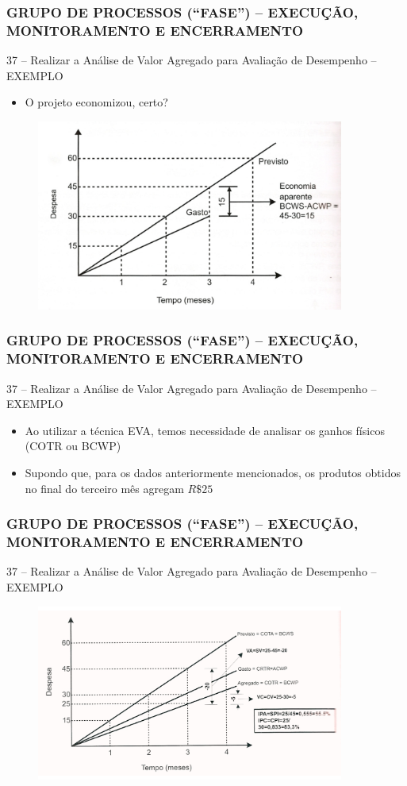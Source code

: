 \begin{frame}
 \frametitle{GRUPO DE PROCESSOS (“FASE”) – \small{EXECUÇÃO, MONITORAMENTO E ENCERRAMENTO}}
 37 – Realizar a Análise de Valor Agregado para Avaliação de Desempenho – EXEMPLO
  \begin{itemize}
   \item O projeto economizou, certo?
  \end{itemize}
  \begin{figure}
   \centering
   \includegraphics[width = 0.9\textwidth]{figs/fig9.png}
  \end{figure}
\end{frame}

\begin{frame}
 \frametitle{GRUPO DE PROCESSOS (“FASE”) – \small{EXECUÇÃO, MONITORAMENTO E ENCERRAMENTO}}
 37 – Realizar a Análise de Valor Agregado para Avaliação de Desempenho – EXEMPLO
  \begin{itemize}
   \item Ao utilizar a técnica EVA, temos necessidade de analisar os ganhos físicos (COTR ou BCWP)
  \item Supondo que, para os dados anteriormente mencionados, os produtos obtidos no final do terceiro mês agregam $R\$25$
  \end{itemize}
\end{frame}

\begin{frame}
 \frametitle{GRUPO DE PROCESSOS (“FASE”) – \small{EXECUÇÃO, MONITORAMENTO E ENCERRAMENTO}}
 37 – Realizar a Análise de Valor Agregado para Avaliação de Desempenho – EXEMPLO
  \begin{figure}
   \centering
   \includegraphics[width = 0.9\textwidth]{figs/fig10.png}
  \end{figure}
\end{frame}


